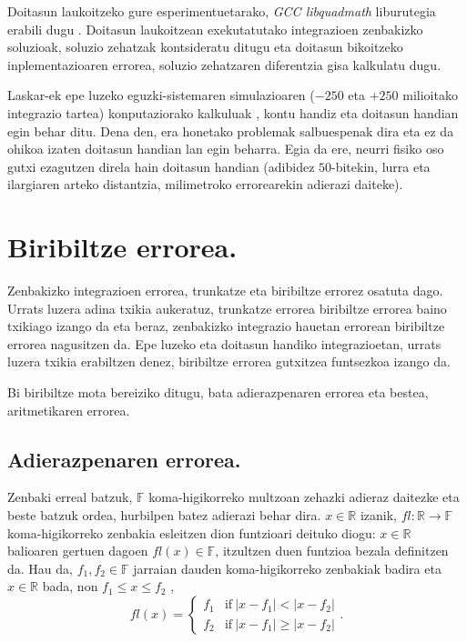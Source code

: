 Doitasun laukoitzeko gure esperimentuetarako, \emph{GCC libquadmath} liburutegia erabili dugu . Doitasun laukoitzean exekutatutako integrazioen zenbakizko soluzioak, soluzio zehatzak kontsideratu ditugu eta  doitasun bikoitzeko inplementazioaren errorea, soluzio zehatzaren diferentzia gisa kalkulatu dugu. 

Laskar-ek epe luzeko eguzki-sistemaren simulazioaren ($-250$ eta $+250$ milioitako integrazio tartea) konputaziorako kalkuluak \cite{Laskar2011}, kontu handiz eta doitasun handian egin behar ditu. Dena den, era honetako problemak salbuespenak dira eta ez da ohikoa izaten doitasun handian lan egin beharra. Egia da ere, neurri fisiko oso gutxi ezagutzen direla  hain doitasun handian (adibidez $50$-bitekin, lurra eta ilargiaren arteko distantzia, milimetroko errorearekin adierazi daiteke).  


\section{Biribiltze errorea.}

Zenbakizko integrazioen errorea, trunkatze eta biribiltze errorez osatuta dago. Urrats luzera adina txikia aukeratuz, trunkatze errorea biribiltze errorea baino txikiago izango da eta beraz, zenbakizko integrazio hauetan errorean biribiltze errorea nagusitzen da. Epe luzeko eta doitasun handiko integrazioetan, urrats luzera txikia erabiltzen denez, biribiltze errorea gutxitzea funtsezkoa izango da.     

Bi biribiltze mota bereiziko ditugu, bata adierazpenaren errorea eta bestea, aritmetikaren errorea.  

\subsection*{Adierazpenaren errorea.} 

Zenbaki erreal batzuk, $\mathbb{F}$ koma-higikorreko multzoan zehazki adieraz daitezke eta beste batzuk ordea, hurbilpen batez adierazi behar dira. $x \in \mathbb{R}$ izanik, $fl: \mathbb{R} \rightarrow \mathbb{F}$ koma-higikorreko zenbakia esleitzen dion funtzioari deituko diogu:  $x \in \mathbb{R}$ balioaren gertuen dagoen  $fl(x) \in \mathbb{F}$, itzultzen duen funtzioa bezala definitzen da. Hau da, $f_1,f_2 \in \mathbb{F}$ jarraian dauden koma-higikorreko zenbakiak  badira eta $x \in \mathbb{R}$ bada, non $f_1\leqslant x \leqslant f_2$ ,
\begin{equation*}
fl(x)=
\left\{
        \begin{array}{lc}
        f_1 & \mathrm{if} \ |x-f_1| < |x-f_2| \\
        f_2 & \mathrm{if} \ |x-f_1| \geqslant |x-f_2| 
        \end{array}.
\right.
\end{equation*}  

